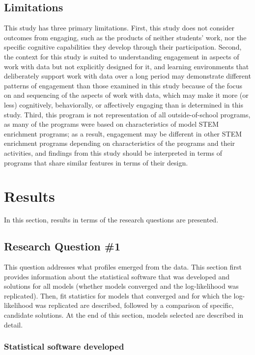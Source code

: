 \documentclass[]{book}
\theoremstyle{definition}
\theoremstyle{definition}
\theoremstyle{definition}
\theoremstyle{remark}
\begin{document}
\section{Limitations}\label{limitations}

This study has three primary limitations. First, this study does not
consider outcomes from engaging, such as the products of neither
students' work, nor the specific cognitive capabilities they develop
through their participation. Second, the context for this study is
suited to understanding engagement in aspects of work with data but not
explicitly designed for it, and learning environments that deliberately
support work with data over a long period may demonstrate different
patterns of engagement than those examined in this study because of the
focus on and sequencing of the aspects of work with data, which may make
it more (or less) cognitively, behaviorally, or affectively engaging
than is determined in this study. Third, this program is not
representation of all outside-of-school programs, as many of the
programs were based on characteristics of model STEM enrichment
programs; as a result, engagement may be different in other STEM
enrichment programs depending on characteristics of the programs and
their activities, and findings from this study should be interpreted in
terms of programs that share similar features in terms of their design.

\chapter{Results}\label{results}

In this section, results in terms of the research questions are
presented.

\section{Research Question \#1}\label{research-question-1}

This question addresses what profiles emerged from the data. This
section first provides information about the statistical software that
was developed and solutions for all models (whether models converged and
the log-likelihood was replicated). Then, fit statistics for models that
converged and for which the log-likelihood was replicated are described,
followed by a comparison of specific, candidate solutions. At the end of
this section, models selected are described in detail.

\subsection{Statistical software
developed}\label{statistical-software-developed}
\end{document}

